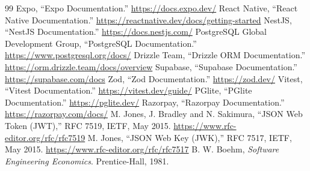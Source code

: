 \clearpage{}
\begin{thebibliography}{99}
 Expo, ``Expo Documentation.'' \url{https://docs.expo.dev/}
 React Native, ``React Native Documentation.'' \url{https://reactnative.dev/docs/getting-started}
 NestJS, ``NestJS Documentation.'' \url{https://docs.nestjs.com/}
 PostgreSQL Global Development Group, ``PostgreSQL Documentation.'' \url{https://www.postgresql.org/docs/}
 Drizzle Team, ``Drizzle ORM Documentation.'' \url{https://orm.drizzle.team/docs/overview}
 Supabase, ``Supabase Documentation.'' \url{https://supabase.com/docs}
 Zod, ``Zod Documentation.'' \url{https://zod.dev/}
 Vitest, ``Vitest Documentation.'' \url{https://vitest.dev/guide/}
 PGlite, ``PGlite Documentation.'' \url{https://pglite.dev/}
 Razorpay, ``Razorpay Documentation.'' \url{https://razorpay.com/docs/}
 M. Jones, J. Bradley and N. Sakimura, ``JSON Web Token (JWT),'' RFC 7519, IETF, May 2015. \url{https://www.rfc-editor.org/rfc/rfc7519}
 M. Jones, ``JSON Web Key (JWK),'' RFC 7517, IETF, May 2015. \url{https://www.rfc-editor.org/rfc/rfc7517}
 B. W. Boehm, \emph{Software Engineering Economics}. Prentice-Hall, 1981.
\end{thebibliography}

\appendix
\renewcommand{\thechapter}{\Alph{chapter}}

